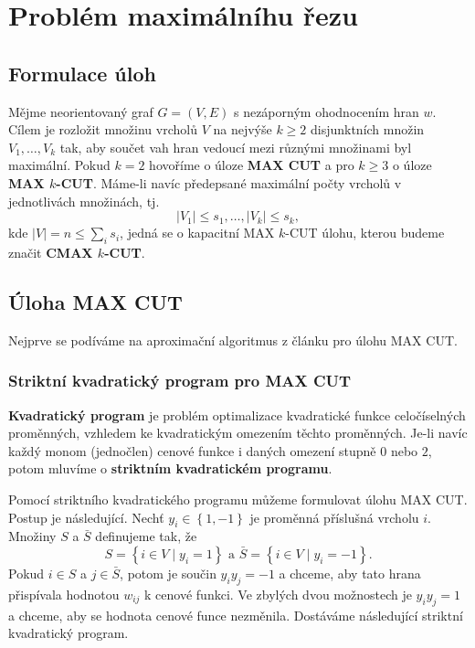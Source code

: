 \chapter{Problém maximálníhu řezu}

\section{Formulace úloh}

Mějme neorientovaný graf $G = (V, E)$ s nezáporným ohodnocením hran $w$. Cílem je rozložit množinu vrcholů $V$ na nejvýše $k \geq 2$ disjunktních množin $V_1, \dots, V_k$ tak, aby součet vah hran vedoucí mezi různými množinami byl maximální. Pokud $k = 2$ hovoříme o úloze \textbf{MAX CUT} a pro $k \geq 3$ o úloze \textbf{MAX $k$-CUT}. Máme-li navíc předepsané maximální počty vrcholů v jednotlivách množinách, tj.
$$
    |V_1| \leq s_1, \dots, |V_k| \leq s_k,
$$
kde $|V| = n \leq \sum_i s_i$, jedná se o kapacitní MAX $k$-CUT úlohu, kterou budeme značit \textbf{CMAX $k$-CUT}. 

\section{Úloha MAX CUT}

Nejprve se podíváme na aproximační algoritmus z článku \cite{max-cut} pro úlohu MAX CUT.

\subsection{Striktní kvadratický program pro MAX CUT}

\textbf{Kvadratický program} je problém optimalizace kvadratické funkce celočíselných proměnných, vzhledem ke kvadratickým omezením těchto proměnných. Je-li navíc každý monom (jednočlen) cenové funkce i daných omezení stupně $0$ nebo $2$, potom mluvíme o \textbf{striktním kvadratickém programu}.

Pomocí striktního kvadratického programu můžeme formulovat úlohu MAX CUT. Postup je následující. Nechť $y_i \in \left\{ 1, -1 \right\}$ je proměnná příslušná vrcholu $i$. Množiny $S$ a $\bar{S}$ definujeme tak, že
$$
    S = \left\{ i \in V \mid y_i = 1 \right\} \text{ a } \bar{S} = \left\{ i \in V \mid y_i = -1 \right\}.
$$
Pokud $i \in S$ a $j \in \bar{S}$, potom je součin $y_i y_j = -1$ a chceme, aby tato hrana přispívala hodnotou $w_{ij}$ k cenové funkci. Ve zbylých dvou možnostech je $y_i y_j = 1$ a chceme, aby se hodnota cenové funce nezměnila. Dostáváme následující striktní kvadratický program.

